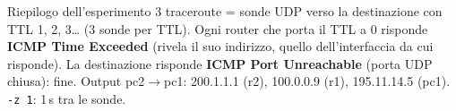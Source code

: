 \begin{appunti}{Riepilogo dell'esperimento 3}
traceroute = sonde UDP verso la destinazione con TTL 1, 2, 3\dots{} (3 sonde per TTL). Ogni router che porta il TTL a 0 risponde \textbf{ICMP Time Exceeded} (rivela il suo indirizzo, quello dell'interfaccia da cui risponde). La destinazione risponde \textbf{ICMP Port Unreachable} (porta UDP chiusa): fine. Output pc2$\to$pc1: 200.1.1.1 (r2), 100.0.0.9 (r1), 195.11.14.5 (pc1). \texttt{-z 1}: 1\,s tra le sonde.
\end{appunti}
